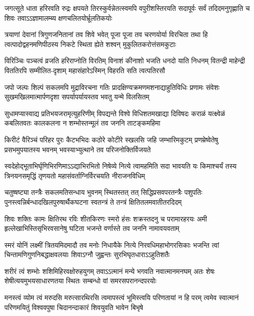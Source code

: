 \fourlineindentedshloka
{जगत्सूते धाता हरिरवति रुद्रः क्षपयते}
{तिरस्कुर्वन्नेतत्स्वमपि वपुरीशस्तिरयति}
{सदापूर्वः सर्वं तदिदमनुगृह्णाति च शिवः}
{तवाऽऽज्ञामालम्ब्य क्षणचलितयोर्भ्रूलतिकयोः}%

\fourlineindentedshloka
{त्रयाणां देवानां त्रिगुणजनितानां तव शिवे}
{भवेत् पूजा पूजा तव चरणयोर्या विरचिता}
{तथा हि त्वत्पादोद्वहनमणिपीठस्य निकटे}
{स्थिता ह्येते शश्वन् मुकुलितकरोत्तंसमकुटाः}%

\fourlineindentedshloka
{विरिञ्चिः पञ्चत्वं व्रजति हरिराप्नोति विरतिम्}
{विनाशं कीनाशो भजति धनदो याति निधनम्}
{वितन्द्री माहेन्द्री विततिरपि सम्मीलित-दृशाम्}
{महासंहारेऽस्मिन् विहरति सति त्वत्पतिरसौ}%

\fourlineindentedshloka
{जपो जल्पः शिल्पं सकलमपि मुद्राविरचना}
{गतिः प्रादक्षिण्यक्रमणमशनाद्याहुतिविधिः}
{प्रणामः संवेशः सुखमखिलमात्मार्पणदृशा}
{सपर्यापर्यायस्तव भवतु यन्मे विलसितम्}%

\fourlineindentedshloka
{सुधामप्यास्वाद्य प्रतिभयजरामृत्युहरिणीम्}
{विपद्यन्ते विश्वे विधिशतमखाद्या दिविषदः}
{कराळं यत्क्ष्वेळं कबलितवतः कालकलना}
{न शम्भोस्तन्मूलं तव जननि ताटङ्कमहिमा}%

\fourlineindentedshloka
{किरीटं वैरिञ्चं परिहर पुरः कैटभभिदः}
{कठोरे कोटीरे स्खलसि जहि जम्भारिमकुटम्}
{प्रणम्रेष्वेतेषु प्रसभमुपयातस्य भवनम्}
{भवस्याभ्युत्थाने तव परिजनोक्तिर्विजयते}%

\fourlineindentedshloka
{स्वदेहोद्भूताभिर्घृणिभिरणिमाऽऽद्याभिरभितो}
{निषेव्ये नित्ये त्वामहमिति सदा भावयति यः}
{किमाश्चर्यं तस्य त्रिनयनसमृद्धिं तृणयतो}
{महासंवर्ताग्निर्विरचयति नीराजनविधिम्}%

\fourlineindentedshloka
{चतुष्षष्ट्या तन्त्रैः सकलमतिसन्धाय भुवनम्}
{स्थितस्तत् तत्  सिद्धिप्रसवपरतन्त्रैः पशुपतिः}
{पुनस्त्वन्निर्बन्धादखिलपुरुषार्थैकघटना}
{स्वतन्त्रं ते तन्त्रं क्षितितलमवातीतरदिदम्}%

\fourlineindentedshloka
{शिवः शक्तिः कामः क्षितिरथ रविः शीतकिरणः}
{स्मरो हंसः शक्रस्तदनु च परामारहरयः}
{अमी हृल्लेखाभिस्तिसृभिरवसानेषु घटिता}
{भजन्ते वर्णास्ते तव जननि नामावयवताम्}%

\fourlineindentedshloka
{स्मरं योनिं लक्ष्मीं त्रितयमिदमादौ तव मनोः}
{निधायैके नित्ये निरवधिमहाभोगरसिकाः}
{भजन्ति त्वां चिन्तामणिगुणनिबद्धाक्षवलयाः}
{शिवाऽग्नौ जुह्वन्तः सुरभिघृतधाराऽऽहुतिशतैः}%

\fourlineindentedshloka
{शरीरं त्वं शम्भोः शशिमिहिरवक्षोरुहयुगम्}
{तवाऽऽत्मानं मन्ये भगवति नवात्मानमनघम्}
{अतः शेषः शेषीत्ययमुभयसाधारणतया}
{स्थितः सम्बन्धो वां समरसपरानन्दपरयोः}%

\fourlineindentedshloka
{मनस्त्वं व्योम त्वं मरुदसि मरुत्सारथिरसि}
{त्वमापस्त्वं भूमिस्त्वयि परिणतायां न हि परम्}
{त्वमेव स्वात्मानं परिणमयितुं विश्ववपुषा}
{चिदानन्दाकारं शिवयुवति भावेन बिभृषे}%

